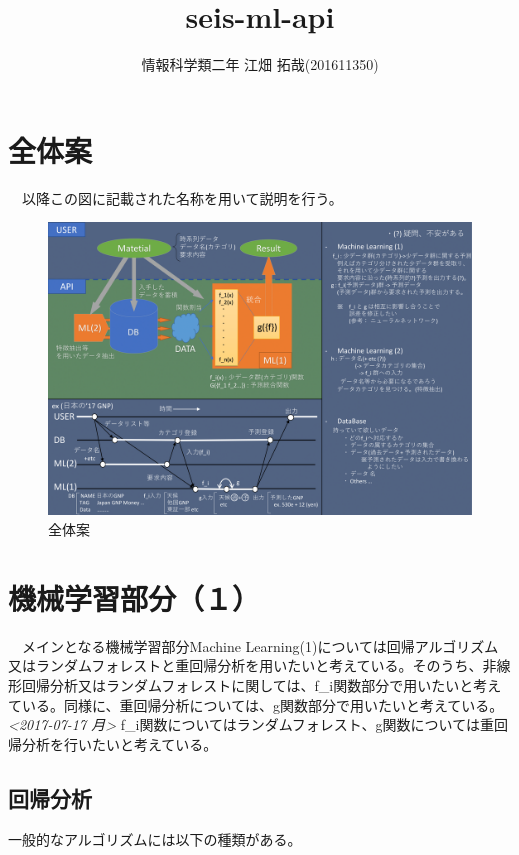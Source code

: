 \documentclass{scrartcl}
\author{情報科学類二年 江畑 拓哉(201611350)}
\date{}
\title{seis-ml-api}
\begin{document}
\maketitle

\section{全体案}
\label{sec:org6323aaf}
　以降この図に記載された名称を用いて説明を行う。\\
\begin{figure}[htp]
  \includegraphics[width=15cm]{./idea-0-1.png}
\caption{全体案}
\end{figure}

\section{機械学習部分（１）}
\label{sec:orge24aa4b}
　メインとなる機械学習部分Machine Learning(1)については回帰アルゴリズム又はランダムフォレストと重回帰分析を用いたいと考えている。そのうち、非線形回帰分析又はランダムフォレストに関しては、f\_i関数部分で用いたいと考えている。同様に、重回帰分析については、g関数部分で用いたいと考えている。\\
\textit{<2017-07-17 月> } f\_i関数についてはランダムフォレスト、g関数については重回帰分析を行いたいと考えている。\\
\subsection{回帰分析}
\label{sec:org52a4efc}
一般的なアルゴリズムには以下の種類がある。 \cite{kobe-u01}\\
\end{document}
